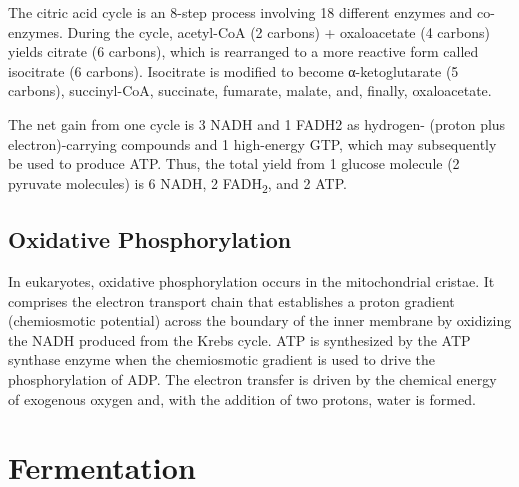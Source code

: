 The citric acid cycle is an 8-step process involving 18 different enzymes and co-enzymes. During the cycle, acetyl-CoA (2 carbons) + oxaloacetate (4 carbons) yields citrate (6 carbons), which is rearranged to a more reactive form called isocitrate (6 carbons). Isocitrate is modified to become α-ketoglutarate (5 carbons), succinyl-CoA, succinate, fumarate, malate, and, finally, oxaloacetate.

The net gain from one cycle is 3 NADH and 1 FADH2 as hydrogen- (proton plus electron)-carrying compounds and 1 high-energy GTP, which may subsequently be used to produce ATP. Thus, the total yield from 1 glucose molecule (2 pyruvate molecules) is 6 NADH, 2 FADH\textsubscript{2}, and 2 ATP.

\hypertarget{oxidative-phosphorylation-1}{%
\subsection{Oxidative Phosphorylation}\label{oxidative-phosphorylation-1}}

In eukaryotes, oxidative phosphorylation occurs in the mitochondrial cristae. It comprises the electron transport chain that establishes a proton gradient (chemiosmotic potential) across the boundary of the inner membrane by oxidizing the NADH produced from the Krebs cycle. ATP is synthesized by the ATP synthase enzyme when the chemiosmotic gradient is used to drive the phosphorylation of ADP. The electron transfer is driven by the chemical energy of exogenous oxygen and, with the addition of two protons, water is formed.

\hypertarget{fermentation}{%
\section{Fermentation}\label{fermentation}}

